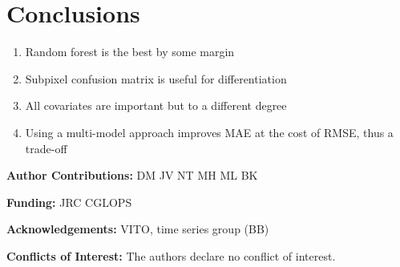 \documentclass[a4paper,10pt]{article}
\newcommand{\minisection}[1]{\medskip \textbf{#1:}}
\begin{document}
\section{Conclusions}

\begin{enumerate}
 \item Random forest is the best by some margin
 \item Subpixel confusion matrix is useful for differentiation
 \item All covariates are important but to a different degree
 \item Using a multi-model approach improves MAE at the cost of RMSE, thus a trade-off
\end{enumerate}

\minisection{Author Contributions} DM JV NT MH ML BK

\minisection{Funding} JRC CGLOPS

\minisection{Acknowledgements} VITO, time series group (BB)

\minisection{Conflicts of Interest} The authors declare no conflict of interest.


\printnoidxglossary[type=acronym]
\end{document}
